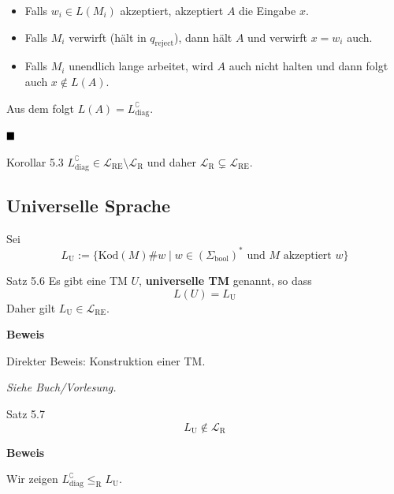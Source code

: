 \documentclass[a4paper, 11pt]{article}
\def\Lre{\mathcal{L}_\text{RE}}
\def\Lr{\mathcal{L}_\text{R}}
\begin{document}
                
                    \begin{itemize}[label=-]
                        \item Falls $w_i \in L(M_i)$ akzeptiert, akzeptiert $A$ die Eingabe $x$.
                        \item Falls $M_i$ verwirft (hält in $q_{\text{reject}}$), dann hält $A$ und verwirft $x = w_i$ auch.
                        \item Falls $M_i$ unendlich lange arbeitet, wird $A$ auch nicht halten und dann folgt auch $x \notin L(A)$.  
                    \end{itemize}
                    Aus dem folgt $L(A) = L_{\text{diag}}^\complement$.
                
                    $\hfill\blacksquare$
                    \begin{subbox}{Korollar 5.3}
                        $L_{\text{diag}}^\complement \in \Lre \setminus \Lr$ und daher $\Lr \subsetneq \Lre$.
                    \end{subbox}
                
                
                
                    \subsection{Universelle Sprache}
                    Sei 
                    $$L_{\text{U}} := \{\text{Kod}(M)\#w \mid w \in (\Sigma_{\text{bool}})^* \text{ und } M \text{ akzeptiert }w\}$$
                    \begin{mainbox}{Satz 5.6}
                        Es gibt eine TM $U$, \textbf{universelle TM} genannt, so dass 
                        $$L(U) = L_{\text{U}}$$
                        Daher gilt $L_{\text{U}} \in \Lre$.
                    \end{mainbox} 
                    \textbf{Beweis}
                
                    Direkter Beweis: Konstruktion einer TM.
                
                    \textit{Siehe Buch/Vorlesung.}
                
                    \begin{mainbox}{Satz 5.7}
                        $$L_{\text{U}} \notin \Lr$$
                    \end{mainbox}
                    \textbf{Beweis}
                
                    Wir zeigen $L_{\text{diag}}^\complement \leq_{\text{R}} L_{\text{U}}$.
                
\end{document}
